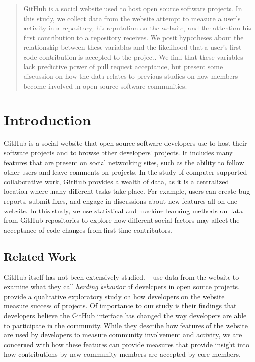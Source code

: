 \documentclass[12pt]{article}
\begin{document}
\maketitle

\begin{abstract}
GitHub is a social website used to host open source software projects. In this
study, we collect data from the website attempt to measure a user's activity in
a repository, his reputation on the website, and the attention his first
contribution to a repository receives. We posit hypotheses about the
relationship between these variables and the likelihood that a user's first code
contribution is accepted to the project. We find that these variables lack
predictive power of pull request acceptance, but present some discussion on how
the data relates to previous studies on how members become involved in open
source software communities.
\end{abstract}

\section{Introduction}
GitHub is a social website that open source software developers use to host
their software projects and to browse other developers' projects. It includes
many features that are present on social networking sites, such as the ability
to follow other users and leave comments on projects. In the study of computer
supported collaborative work, GitHub provides a wealth of data, as it is a
centralized location where many different tasks take place. For example, users
can create bug reports, submit fixes, and engage in discussions about new
features all on one website.  In this study, we use statistical and machine
learning methods on data from GitHub repositories to explore how different
social factors may affect the acceptance of code changes from first time
contributors.

\subsection{Related Work}
GitHub itself has not been extensively studied. ~\cite{choi_herding_2013} use
data from the website to examine what they call \textit{herding behavior} of
developers in open source projects.  ~\cite{mcdonald_performance_2013} provide a
qualitative exploratory study on how developers on the website measure success
of projects. Of importance to our study is their findings that developers
believe the GitHub interface has changed the way developers are able to
participate in the community. While they describe how features of the website
are used by developers to measure community involvement and activity, we are
concerned with how these features can provide measures that provide insight into
how contributions by new community members are accepted by core members.
\end{document}
